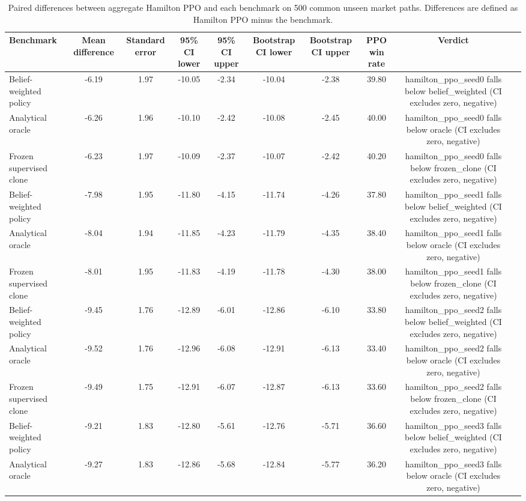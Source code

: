 \begin{table}
\caption{Paired differences between aggregate Hamilton PPO and each benchmark on 500 common unseen market paths. Differences are defined as Hamilton PPO minus the benchmark.}
\label{tab:phase7-unseen-paired-comparisons}
\begin{tabular}{lccccccccl}
\toprule
Benchmark & Mean difference & Standard error & 95\% CI lower & 95\% CI upper & Bootstrap CI lower & Bootstrap CI upper & PPO win rate & Verdict \\
\midrule
Belief-weighted policy & -6.19 & 1.97 & -10.05 & -2.34 & -10.04 & -2.38 & 39.80 & hamilton\_ppo\_seed0 falls below belief\_weighted (CI excludes zero, negative) \\
Analytical oracle & -6.26 & 1.96 & -10.10 & -2.42 & -10.08 & -2.45 & 40.00 & hamilton\_ppo\_seed0 falls below oracle (CI excludes zero, negative) \\
Frozen supervised clone & -6.23 & 1.97 & -10.09 & -2.37 & -10.07 & -2.42 & 40.20 & hamilton\_ppo\_seed0 falls below frozen\_clone (CI excludes zero, negative) \\
Belief-weighted policy & -7.98 & 1.95 & -11.80 & -4.15 & -11.74 & -4.26 & 37.80 & hamilton\_ppo\_seed1 falls below belief\_weighted (CI excludes zero, negative) \\
Analytical oracle & -8.04 & 1.94 & -11.85 & -4.23 & -11.79 & -4.35 & 38.40 & hamilton\_ppo\_seed1 falls below oracle (CI excludes zero, negative) \\
Frozen supervised clone & -8.01 & 1.95 & -11.83 & -4.19 & -11.78 & -4.30 & 38.00 & hamilton\_ppo\_seed1 falls below frozen\_clone (CI excludes zero, negative) \\
Belief-weighted policy & -9.45 & 1.76 & -12.89 & -6.01 & -12.86 & -6.10 & 33.80 & hamilton\_ppo\_seed2 falls below belief\_weighted (CI excludes zero, negative) \\
Analytical oracle & -9.52 & 1.76 & -12.96 & -6.08 & -12.91 & -6.13 & 33.40 & hamilton\_ppo\_seed2 falls below oracle (CI excludes zero, negative) \\
Frozen supervised clone & -9.49 & 1.75 & -12.91 & -6.07 & -12.87 & -6.13 & 33.60 & hamilton\_ppo\_seed2 falls below frozen\_clone (CI excludes zero, negative) \\
Belief-weighted policy & -9.21 & 1.83 & -12.80 & -5.61 & -12.76 & -5.71 & 36.60 & hamilton\_ppo\_seed3 falls below belief\_weighted (CI excludes zero, negative) \\
Analytical oracle & -9.27 & 1.83 & -12.86 & -5.68 & -12.84 & -5.77 & 36.20 & hamilton\_ppo\_seed3 falls below oracle (CI excludes zero, negative) \\

\end{tabular}
\end{table}
